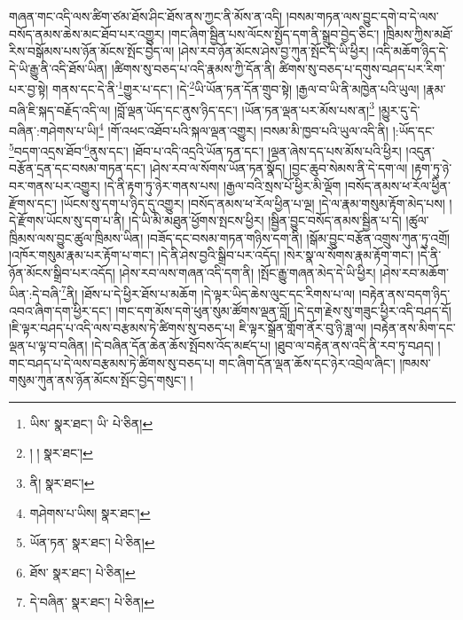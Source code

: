 གཞན་གང་འདི་ལས་ཚིག་ཙམ་ཐོས་ཤིང་ཐོས་ནས་ཀྱང་ནི་མོས་ན་འདི། །བསམ་གཏན་ལས་བྱུང་དགེ་བ་དེ་ལས་བསོད་ནམས་ཆེས་མང་ཐོབ་པར་འགྱུར། །གང་ཞིག་སྦྱིན་པས་ལོངས་སྤྱོད་དག་ནི་སྒྲུབ་བྱེད་ཅིང་། །ཁྲིམས་ཀྱིས་མཐོ་རིས་བསྒོམས་པས་ཉོན་མོངས་སྤོང་བྱེད་ལ། །ཤེས་རབ་ཉོན་མོངས་ཤེས་བྱ་ཀུན་སྤོང་དེ་ཡི་ཕྱིར། །འདི་མཆོག་ཉིད་དེ་དེ་ཡི་རྒྱུ་ནི་འདི་ཐོས་ཡིན། །ཚིགས་སུ་བཅད་པ་འདི་རྣམས་ཀྱི་དོན་ནི། ཚིགས་སུ་བཅད་པ་དགུས་བཤད་པར་རིག་པར་བྱ་སྟེ། གནས་དང་དེ་ནི་\footnote{ཡིས་  སྣར་ཐང་། ཡི་  པེ་ཅིན། }གྱུར་པ་དང་། །དེ་\footnote{། །  སྣར་ཐང་། }ཡི་ཡོན་ཏན་དོན་གྲུབ་སྟེ། །རྒྱལ་བ་ཡི་ནི་མཁྱེན་པའི་ཡུལ། །རྣམ་བཞི་ཇི་སྐད་བརྗོད་འདི་ལ། །བློ་ལྡན་ཡོད་དང་ནུས་ཉིད་དང་། །ཡོན་ཏན་ལྡན་པར་མོས་པས་ན།\footnote{ནི།  སྣར་ཐང་། } །མྱུར་དུ་དེ་བཞིན་:གཤེགས་པ་ཡི།\footnote{གཤེགས་པ་ཡིས།  སྣར་ཐང་། } །གོ་འཕང་འཐོབ་པའི་སྐལ་ལྡན་འགྱུར། །བསམ་མི་ཁྱབ་པའི་ཡུལ་འདི་ནི། །:ཡོད་དང་\footnote{ཡོན་ཏན་  སྣར་ཐང་།  པེ་ཅིན། }བདག་འདྲས་ཐོབ་\footnote{ཐོས་  སྣར་ཐང་།  པེ་ཅིན། }ནུས་དང་། །ཐོབ་པ་འདི་འདྲའི་ཡོན་ཏན་དང་། །ལྡན་ཞེས་དད་པས་མོས་པའི་ཕྱིར། །འདུན་བརྩོན་དྲན་དང་བསམ་གཏན་དང་། །ཤེས་རབ་ལ་སོགས་ཡོན་ཏན་སྣོད། །བྱང་ཆུབ་སེམས་ནི་དེ་དག་ལ། །རྟག་ཏུ་ཉེ་བར་གནས་པར་འགྱུར། །དེ་ནི་རྟག་ཏུ་ཉེར་གནས་པས། །རྒྱལ་བའི་སྲས་པོ་ཕྱིར་མི་ལྡོག །བསོད་ནམས་ཕ་རོལ་ཕྱིན་རྫོགས་དང་། །ཡོངས་སུ་དག་པ་ཉིད་དུ་འགྱུར། །བསོད་ནམས་ཕ་རོལ་ཕྱིན་པ་ལྔ། །དེ་ལ་རྣམ་གསུམ་རྟོག་མེད་པས། །དེ་རྫོགས་ཡོངས་སུ་དག་པ་ནི། །དེ་ཡི་མི་མཐུན་ཕྱོགས་སྤངས་ཕྱིར། །སྦྱིན་བྱུང་བསོད་ནམས་སྦྱིན་པ་དེ། །ཚུལ་ཁྲིམས་ལས་བྱུང་ཚུལ་ཁྲིམས་ཡིན། །བཟོད་དང་བསམ་གཏན་གཉིས་དག་ནི། །སྒོམ་བྱུང་བརྩོན་འགྲུས་ཀུན་ཏུ་འགྲོ། །འཁོར་གསུམ་རྣམ་པར་རྟོག་པ་གང་། །དེ་ནི་ཤེས་བྱའི་སྒྲིབ་པར་འདོད། །སེར་སྣ་ལ་སོགས་རྣམ་རྟོག་གང་། །དེ་ནི་ཉོན་མོངས་སྒྲིབ་པར་འདོད། །ཤེས་རབ་ལས་གཞན་འདི་དག་ནི། །སྤོང་རྒྱུ་གཞན་མེད་དེ་ཡི་ཕྱིར། །ཤེས་རབ་མཆོག་ཡིན་:དེ་བཞི་\footnote{དེ་བཞིན་  སྣར་ཐང་།  པེ་ཅིན། }ནི། །ཐོས་པ་དེ་ཕྱིར་ཐོས་པ་མཆོག །དེ་ལྟར་ཡིད་ཆེས་ལུང་དང་རིགས་པ་ལ། །བརྟེན་ནས་བདག་ཉིད་འབའ་ཞིག་དག་ཕྱིར་དང་། །གང་དག་མོས་དགེ་ཕུན་སུམ་ཚོགས་ལྡན་བློ། །དེ་དག་རྗེས་སུ་གཟུང་ཕྱིར་འདི་བཤད་དོ། །ཇི་ལྟར་བཤད་པ་འདི་ལས་བརྩམས་ཏེ་ཚིགས་སུ་བཅད་པ། ཇི་ལྟར་སྒྲོན་གློག་ནོར་བུ་ཉི་ཟླ་ལ། །བརྟེན་ནས་མིག་དང་ལྡན་པ་ལྟ་བ་བཞིན། །དེ་བཞིན་དོན་ཆེན་ཆོས་སྤོབས་འོད་མཛད་པ། །ཐུབ་ལ་བརྟེན་ནས་འདི་ནི་རབ་ཏུ་བཤད། །གང་བཤད་པ་དེ་ལས་བརྩམས་ཏེ་ཚིགས་སུ་བཅད་པ། གང་ཞིག་དོན་ལྡན་ཆོས་དང་ཉེར་འབྲེལ་ཞིང་། །ཁམས་གསུམ་ཀུན་ནས་ཉོན་མོངས་སྤོང་བྱེད་གསུང་། །
